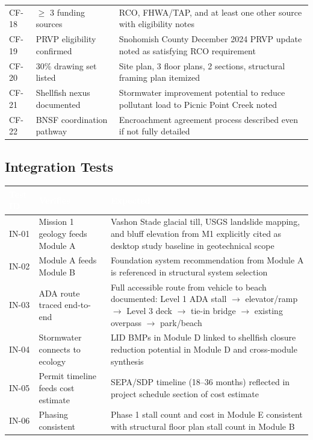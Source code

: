 \documentclass[11pt,letterpaper]{article}
\newcommand{\tableheader}[1]{\textbf{\sffamily\textcolor{white}{#1}}}
\begin{document}
\begin{center}
\begin{tabularx}{\textwidth}{L{1.5cm}L{3.5cm}X}
CF-18 & $\geq$ 3 funding sources & RCO, FHWA/TAP, and at least one other source with eligibility notes \\
CF-19 & PRVP eligibility confirmed & Snohomish County December 2024 PRVP update noted as satisfying RCO requirement \\
CF-20 & 30\% drawing set listed & Site plan, 3 floor plans, 2 sections, structural framing plan itemized \\
CF-21 & Shellfish nexus documented & Stormwater improvement potential to reduce pollutant load to Picnic Point Creek noted \\
CF-22 & BNSF coordination pathway & Encroachment agreement process described even if not fully detailed \\
\bottomrule
\end{tabularx}
\end{center}

\subsection{Integration Tests}

\begin{center}
\begin{tabularx}{\textwidth}{L{1.5cm}L{3.5cm}X}
\toprule
{}
\tableheader{Test ID} & \tableheader{Verifies} & \tableheader{Expected} \\
\midrule
IN-01 & Mission 1 geology feeds Module A & Vashon Stade glacial till, USGS landslide mapping, and bluff elevation from M1 explicitly cited as desktop study baseline in geotechnical scope \\
IN-02 & Module A feeds Module B & Foundation system recommendation from Module A is referenced in structural system selection \\
IN-03 & ADA route traced end-to-end & Full accessible route from vehicle to beach documented: Level 1 ADA stall $\rightarrow$ elevator/ramp $\rightarrow$ Level 3 deck $\rightarrow$ tie-in bridge $\rightarrow$ existing overpass $\rightarrow$ park/beach \\
IN-04 & Stormwater connects to ecology & LID BMPs in Module D linked to shellfish closure reduction potential in Module D and cross-module synthesis \\
IN-05 & Permit timeline feeds cost estimate & SEPA/SDP timeline (18--36 months) reflected in project schedule section of cost estimate \\
IN-06 & Phasing consistent & Phase 1 stall count and cost in Module E consistent with structural floor plan stall count in Module B \\
\bottomrule
\end{tabularx}
\end{center}
\end{document}
